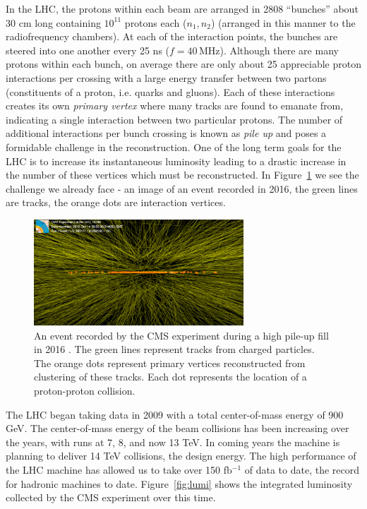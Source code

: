 In the LHC, the protons within each beam are arranged in 2808 ``bunches'' about 30 cm long containing $10^{11}$ protons each ($n_{1}, n_{2}$) (arranged in this manner to the radiofrequency chambers). At each of the interaction points, the bunches are steered into one another every 25 ns ($f=40\,\textrm{MHz}$). Although there are many protons within each bunch, on average there are only about 25 appreciable proton interactions per crossing with a large energy transfer between two partons (constituents of a proton, i.e. quarks and gluons). Each of these interactions creates its own \textit{primary vertex} where many tracks are found to emanate from, indicating a single interaction between two particular protons. The number of additional interactions per bunch crossing is known as \textit{pile up} and poses a formidable challenge in the reconstruction. One of the long term goals for the LHC is to increase its instantaneous luminosity leading to a drastic increase in the number of these vertices which must be reconstructed. In Figure~\ref{fig:pu} we see  the challenge we already face - an image of an event recorded in 2016, the green lines are tracks, the orange dots are interaction vertices.

\begin{figure}
\centering
\includegraphics[width=0.7\textwidth]{figs/highpileup0_4.png}
\caption[An event recorded by the CMS experiment during a high pile-up fill in 2016.]{An event recorded by the CMS experiment during a high pile-up fill in 2016 \cite{pu}. The green lines represent tracks from charged particles. The orange dots represent primary vertices reconstructed from clustering of these tracks. Each dot represents the location of a proton-proton collision.}
\label{fig:pu}
\end{figure}

The LHC began taking data in 2009 with a total center-of-mass energy of 900 GeV. The center-of-mass energy of the beam collisions has been increasing over the years, with runs at 7, 8, and now 13 TeV. In coming years the machine is planning to deliver 14 TeV collisions, the design energy. The high performance of the LHC machine has allowed us to take over 150 fb$^{-1}$ of data to date, the record for hadronic machines to date. Figure~\ref{fig:lumi} shows the integrated luminosity collected by the CMS experiment over this time.

